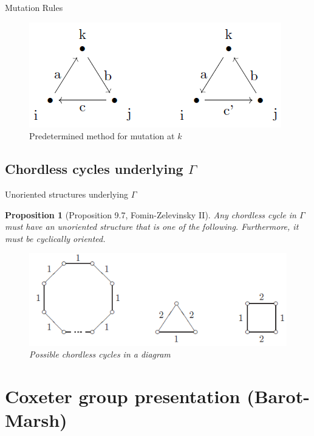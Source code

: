 \documentclass{beamer}
\newtheorem{proposition}{Proposition}
\begin{document}
\begin{frame}{Mutation Rules}
\begin{figure}[h]
\centering
\includegraphics[scale = .65]{mutationrules.PNG}
\caption{Predetermined method for mutation at $k$}
\end{figure}
\end{frame}

\subsection{Chordless cycles underlying $\Gamma$}

\begin{frame}{Unoriented structures underlying $\Gamma$}
\begin{proposition}
[Proposition 9.7, Fomin-Zelevinsky II]
Any chordless cycle in $\Gamma$ must have an unoriented structure that is one of the following. Furthermore, it must be cyclically oriented.
\begin{figure}[h]
\centering
\includegraphics[scale = .65]{chordlesscycles.PNG}
\caption{Possible chordless cycles in a diagram}
\end{figure}

\end{proposition}
\end{frame}

\begin{frame}
\tableofcontents 
\end{frame}

\section{Coxeter group presentation (Barot-Marsh)}
\end{document}
